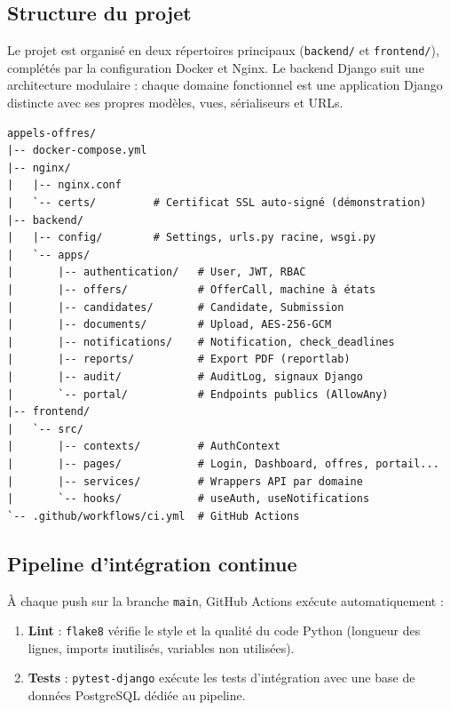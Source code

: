 \subsection{Structure du projet}

Le projet est organisé en deux répertoires principaux (\texttt{backend/} et \texttt{frontend/}), complétés par la configuration Docker et Nginx. Le backend Django suit une architecture modulaire : chaque domaine fonctionnel est une application Django distincte avec ses propres modèles, vues, sérialiseurs et URLs.

\begin{lstlisting}[style=PythonStyle, language={}, caption={Structure du projet}]
appels-offres/
|-- docker-compose.yml
|-- nginx/
|   |-- nginx.conf
|   `-- certs/         # Certificat SSL auto-signé (démonstration)
|-- backend/
|   |-- config/        # Settings, urls.py racine, wsgi.py
|   `-- apps/
|       |-- authentication/   # User, JWT, RBAC
|       |-- offers/           # OfferCall, machine à états
|       |-- candidates/       # Candidate, Submission
|       |-- documents/        # Upload, AES-256-GCM
|       |-- notifications/    # Notification, check_deadlines
|       |-- reports/          # Export PDF (reportlab)
|       |-- audit/            # AuditLog, signaux Django
|       `-- portal/           # Endpoints publics (AllowAny)
|-- frontend/
|   `-- src/
|       |-- contexts/         # AuthContext
|       |-- pages/            # Login, Dashboard, offres, portail...
|       |-- services/         # Wrappers API par domaine
|       `-- hooks/            # useAuth, useNotifications
`-- .github/workflows/ci.yml  # GitHub Actions
\end{lstlisting}

\subsection{Pipeline d'intégration continue}

À chaque push sur la branche \texttt{main}, GitHub Actions exécute automatiquement :

\begin{enumerate}
    \item \textbf{Lint} : \texttt{flake8} vérifie le style et la qualité du code Python (longueur des lignes, imports inutilisés, variables non utilisées).
    \item \textbf{Tests} : \texttt{pytest-django} exécute les tests d'intégration avec une base de données PostgreSQL dédiée au pipeline.
\end{enumerate}

